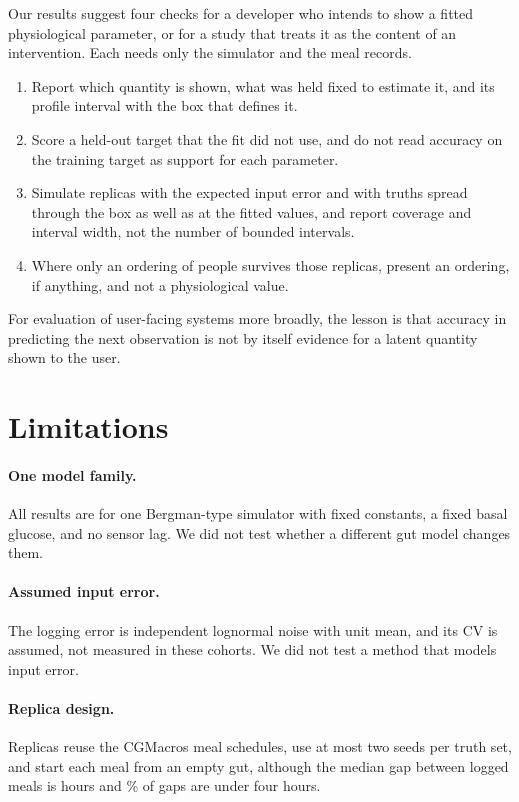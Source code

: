 \documentclass[letterpaper]{article} %
\begin{document}
Our results suggest four checks for a developer who intends to show a fitted physiological parameter, or for a study that treats it as the content of an intervention. Each needs only the simulator and the meal records.
\begin{enumerate}
\item Report which quantity is shown, what was held fixed to estimate it, and its profile interval with the box that defines it.
\item Score a held-out target that the fit did not use, and do not read accuracy on the training target as support for each parameter.
\item Simulate replicas with the expected input error and with truths spread through the box as well as at the fitted values, and report coverage and interval width, not the number of bounded intervals.
\item Where only an ordering of people survives those replicas, present an ordering, if anything, and not a physiological value.
\end{enumerate}
For evaluation of user-facing systems more broadly, the lesson is that accuracy in predicting the next observation is not by itself evidence for a latent quantity shown to the user.

\section{Limitations}

\paragraph{One model family.} All results are for one Bergman-type simulator with fixed constants, a fixed basal glucose, and no sensor lag. We did not test whether a different gut model changes them.

\paragraph{Assumed input error.} The logging error is independent lognormal noise with unit mean, and its CV is assumed, not measured in these cohorts. We did not test a method that models input error.

\paragraph{Replica design.} Replicas reuse the \wsN{} CGMacros meal schedules, use at most two seeds per truth set, and start each meal from an empty gut, although the median gap between logged meals is \resOverlapMedianGap{} hours and \resOverlapWithinFour\% of gaps are under four hours.
\end{document}
